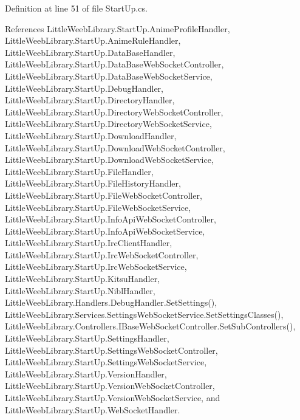 Definition at line 51 of file Start\+Up.\+cs.



References Little\+Weeb\+Library.\+Start\+Up.\+Anime\+Profile\+Handler, Little\+Weeb\+Library.\+Start\+Up.\+Anime\+Rule\+Handler, Little\+Weeb\+Library.\+Start\+Up.\+Data\+Base\+Handler, Little\+Weeb\+Library.\+Start\+Up.\+Data\+Base\+Web\+Socket\+Controller, Little\+Weeb\+Library.\+Start\+Up.\+Data\+Base\+Web\+Socket\+Service, Little\+Weeb\+Library.\+Start\+Up.\+Debug\+Handler, Little\+Weeb\+Library.\+Start\+Up.\+Directory\+Handler, Little\+Weeb\+Library.\+Start\+Up.\+Directory\+Web\+Socket\+Controller, Little\+Weeb\+Library.\+Start\+Up.\+Directory\+Web\+Socket\+Service, Little\+Weeb\+Library.\+Start\+Up.\+Download\+Handler, Little\+Weeb\+Library.\+Start\+Up.\+Download\+Web\+Socket\+Controller, Little\+Weeb\+Library.\+Start\+Up.\+Download\+Web\+Socket\+Service, Little\+Weeb\+Library.\+Start\+Up.\+File\+Handler, Little\+Weeb\+Library.\+Start\+Up.\+File\+History\+Handler, Little\+Weeb\+Library.\+Start\+Up.\+File\+Web\+Socket\+Controller, Little\+Weeb\+Library.\+Start\+Up.\+File\+Web\+Socket\+Service, Little\+Weeb\+Library.\+Start\+Up.\+Info\+Api\+Web\+Socket\+Controller, Little\+Weeb\+Library.\+Start\+Up.\+Info\+Api\+Web\+Socket\+Service, Little\+Weeb\+Library.\+Start\+Up.\+Irc\+Client\+Handler, Little\+Weeb\+Library.\+Start\+Up.\+Irc\+Web\+Socket\+Controller, Little\+Weeb\+Library.\+Start\+Up.\+Irc\+Web\+Socket\+Service, Little\+Weeb\+Library.\+Start\+Up.\+Kitsu\+Handler, Little\+Weeb\+Library.\+Start\+Up.\+Nibl\+Handler, Little\+Weeb\+Library.\+Handlers.\+Debug\+Handler.\+Set\+Settings(), Little\+Weeb\+Library.\+Services.\+Settings\+Web\+Socket\+Service.\+Set\+Settings\+Classes(), Little\+Weeb\+Library.\+Controllers.\+I\+Base\+Web\+Socket\+Controller.\+Set\+Sub\+Controllers(), Little\+Weeb\+Library.\+Start\+Up.\+Settings\+Handler, Little\+Weeb\+Library.\+Start\+Up.\+Settings\+Web\+Socket\+Controller, Little\+Weeb\+Library.\+Start\+Up.\+Settings\+Web\+Socket\+Service, Little\+Weeb\+Library.\+Start\+Up.\+Version\+Handler, Little\+Weeb\+Library.\+Start\+Up.\+Version\+Web\+Socket\+Controller, Little\+Weeb\+Library.\+Start\+Up.\+Version\+Web\+Socket\+Service, and Little\+Weeb\+Library.\+Start\+Up.\+Web\+Socket\+Handler.


